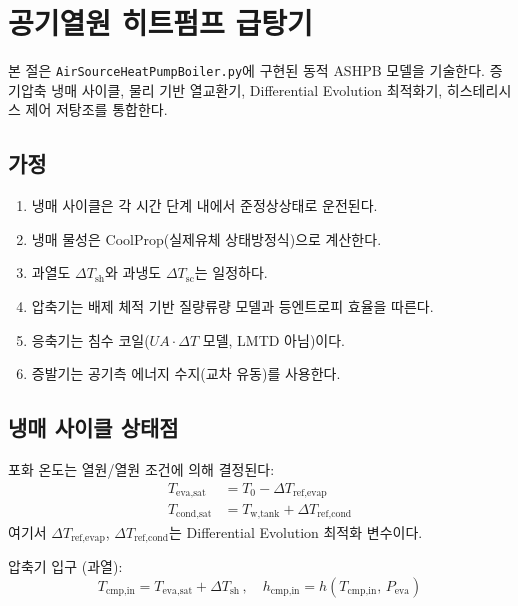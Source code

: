 \section{공기열원 히트펌프 급탕기}
\label{sec:ashpb}

본 절은 \texttt{AirSourceHeatPumpBoiler.py}에 구현된 동적 ASHPB 모델을 기술한다. 증기압축 냉매 사이클, 물리 기반 열교환기, Differential Evolution 최적화기, 히스테리시스 제어 저탕조를 통합한다.

\subsection{가정}
\begin{enumerate}
  \item 냉매 사이클은 각 시간 단계 내에서 준정상상태로 운전된다.
  \item 냉매 물성은 CoolProp(실제유체 상태방정식)으로 계산한다.
  \item 과열도 $\Delta T_\text{sh}$와 과냉도 $\Delta T_\text{sc}$는 일정하다.
  \item 압축기는 배제 체적 기반 질량류량 모델과 등엔트로피 효율을 따른다.
  \item 응축기는 침수 코일($UA\cdot\Delta T$ 모델, LMTD 아님)이다.
  \item 증발기는 공기측 에너지 수지(교차 유동)를 사용한다.
\end{enumerate}

\subsection{냉매 사이클 상태점}

포화 온도는 열원/열원 조건에 의해 결정된다:
\begin{align}
  T_\text{eva,sat} &= T_0 - \Delta T_\text{ref,evap}  \label{eq:ashp-Teva}\\
  T_\text{cond,sat} &= T_\text{w,tank} + \Delta T_\text{ref,cond} \label{eq:ashp-Tcond}
\end{align}
여기서 $\Delta T_\text{ref,evap}$, $\Delta T_\text{ref,cond}$는 Differential Evolution 최적화 변수이다.

압축기 입구 (과열):
\begin{equation}\label{eq:ashp-cmp-in}
  T_\text{cmp,in} = T_\text{eva,sat} + \Delta T_\text{sh}
  \,,\quad
  h_\text{cmp,in} = h(T_\text{cmp,in},\,P_\text{eva})
\end{equation}

